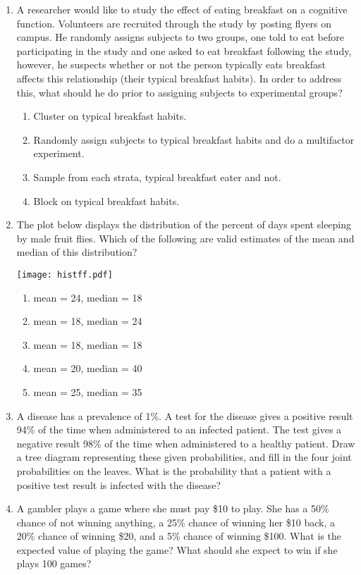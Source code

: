 \documentclass[11pt,fullpage]{amsart}
\begin{document}
\begin{enumerate}
\vfill

\item
A researcher would like to study the effect of eating breakfast on a cognitive function. Volunteers are recruited through the study by posting flyers on campus.  He randomly assigns subjects to two groups, one told to eat before participating in the study and one asked to eat breakfast following the study, however, he suspects whether or not the person typically eats breakfast affects this relationship (their typical breakfast habits). In order to address this, what should he do prior to assigning subjects to experimental groups?
\begin{enumerate}
\item	Cluster on typical breakfast habits.
\item	Randomly assign subjects to typical breakfast habits and do a multifactor experiment.
\item	Sample from each strata, typical breakfast eater and not.
\item	Block on typical breakfast habits.
\end{enumerate}

\vfill

\item
The plot below displays the distribution of the percent of days spent sleeping by male fruit flies.  Which of the following are valid estimates of the mean and median of this distribution?
    \begin{center}
    \texttt{[image: histff.pdf]}\\
    \end{center}
\begin{enumerate}
    \item
    mean = 24, median = 18
    \item
     mean = 18, median = 24
    \item
    mean = 18, median = 18
    \item
    mean = 20, median = 40
    \item
    mean = 25, median = 35
\end{enumerate}

\vfill

\item A disease has a prevalence of 1\%. A test for the disease gives a positive result 94\% of the time when administered to an infected patient. The test gives a negative result 98\% of the time when administered to a healthy patient. Draw a tree diagram representing these given probabilities, and fill in the four joint probabilities on the leaves. What is the probability that a patient with a positive test result is infected with the disease?

\vfill

\item A gambler plays a game where she must pay \$10 to play. She has a 50\% chance of not winning anything, a 25\% chance of winning her \$10 back, a 20\% chance of winning \$20, and a 5\% chance of winning \$100. What is the expected value of playing the game? What should she expect to win if she plays 100 games? 


\end{enumerate}
\end{document}
